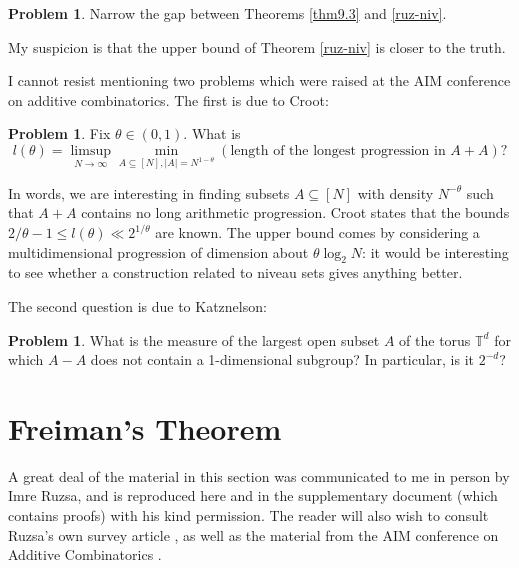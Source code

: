 \documentclass[12pt,a4paper,reqno]{amsart}
\numberwithin{equation}{section}
\theoremstyle{plain}
\theoremstyle{definition}
\newtheorem{problem}[subsection]{Problem}
\renewcommand{\leq}{\leqslant}
\begin{document}
\begin{problem}
Narrow the gap between Theorems \ref{thm9.3} and \ref{ruz-niv}.
\end{problem}
\noindent My suspicion is that the upper bound of Theorem \ref{ruz-niv} is closer to the truth.\vspace{11pt}

\noindent I cannot resist mentioning two problems which were raised at the AIM conference on additive combinatorics. The first is due to Croot:

\begin{problem} Fix $\theta \in (0,1)$. What is 
\[ l(\theta) = \limsup_{N \rightarrow \infty} \min_{A \subseteq [N], |A| = N^{1 - \theta}} (\mbox{length of the longest progression in $A + A$})?\]
\end{problem}

\noindent In words, we are interesting in finding subsets $A \subseteq [N]$ with density $N^{-\theta}$ such that $A + A$ contains no long arithmetic progression. Croot states that the bounds $2/\theta - 1 \leq l(\theta) \ll 2^{1/\theta}$ are known. The upper bound comes by considering a multidimensional progression of dimension about $\theta \log_2 N$: it would be interesting to see whether a construction related to niveau sets gives anything better.\vspace{11pt}

\noindent The second question is due to Katznelson:

\begin{problem} What is the measure of the largest open subset $A$ of the torus $\mathbb{T}^d$ for which $A - A$ does not contain a 1-dimensional subgroup? In particular, is it $2^{-d}$?
\end{problem}



\section{Freiman's Theorem}\label{sec10}

\noindent A great deal of the material in this section was communicated to me in person by Imre Ruzsa, and is reproduced here and in the supplementary document \cite{sup-doc-2} (which contains proofs) with his kind permission. The reader will also wish to consult Ruzsa's own survey article \cite{ruzsa-survey}, as well as the material from the AIM conference on Additive Combinatorics \cite{aim-notes}.\vspace{11pt}
\end{document}
